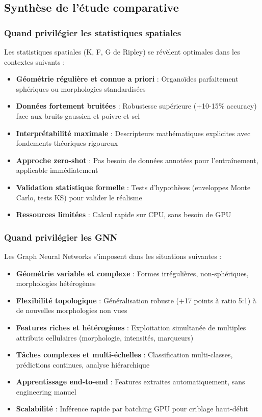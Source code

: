 \subsection{Synthèse de l'étude comparative}

\subsubsection{Quand privilégier les statistiques spatiales}

Les statistiques spatiales (K, F, G de Ripley) se révèlent optimales dans les contextes suivants :

\begin{itemize}
    \item \textbf{Géométrie régulière et connue a priori} : Organoïdes parfaitement sphériques ou morphologies standardisées
    \item \textbf{Données fortement bruitées} : Robustesse supérieure (+10-15\% accuracy) face aux bruits gaussien et poivre-et-sel
    \item \textbf{Interprétabilité maximale} : Descripteurs mathématiques explicites avec fondements théoriques rigoureux
    \item \textbf{Approche zero-shot} : Pas besoin de données annotées pour l'entraînement, applicable immédiatement
    \item \textbf{Validation statistique formelle} : Tests d'hypothèses (enveloppes Monte Carlo, tests KS) pour valider le réalisme
    \item \textbf{Ressources limitées} : Calcul rapide sur CPU, sans besoin de GPU
\end{itemize}

\subsubsection{Quand privilégier les GNN}

Les Graph Neural Networks s'imposent dans les situations suivantes :

\begin{itemize}
    \item \textbf{Géométrie variable et complexe} : Formes irrégulières, non-sphériques, morphologies hétérogènes
    \item \textbf{Flexibilité topologique} : Généralisation robuste (+17 points à ratio 5:1) à de nouvelles morphologies non vues
    \item \textbf{Features riches et hétérogènes} : Exploitation simultanée de multiples attributs cellulaires (morphologie, intensités, marqueurs)
    \item \textbf{Tâches complexes et multi-échelles} : Classification multi-classes, prédictions continues, analyse hiérarchique
    \item \textbf{Apprentissage end-to-end} : Features extraites automatiquement, sans engineering manuel
    \item \textbf{Scalabilité} : Inférence rapide par batching GPU pour criblage haut-débit
\end{itemize}

